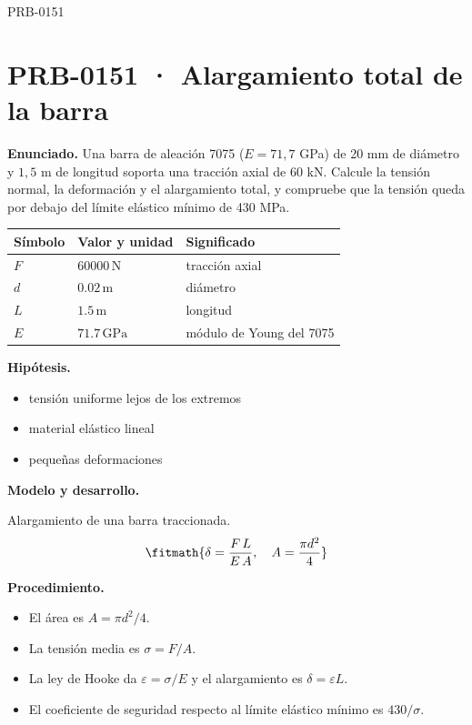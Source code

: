 \begin{studiumworked}{PRB-0151}

\section{PRB-0151 · Alargamiento total de la barra}

\textbf{Enunciado.} Una barra de aleación 7075 ($E = 71{,}7$ GPa) de 20 mm de diámetro y $1{,}5$ m de longitud soporta una tracción axial de 60 kN. Calcule la tensión normal, la deformación y el alargamiento total, y compruebe que la tensión queda por debajo del límite elástico mínimo de 430 MPa.

\par\medskip\noindent\begin{tabular}{@{}p{.18\linewidth}p{.26\linewidth}p{.48\linewidth}@{}}
\toprule Símbolo & Valor y unidad & Significado\\\midrule
$F$ & $60000\,\mathrm{N}$ & tracción axial\\
$d$ & $0.02\,\mathrm{m}$ & diámetro\\
$L$ & $1.5\,\mathrm{m}$ & longitud\\
$E$ & $71.7\,\mathrm{GPa}$ & módulo de Young del 7075\\
\bottomrule\end{tabular}\par\medskip

\textbf{Hipótesis.}\begin{itemize}\item tensión uniforme lejos de los extremos
\item material elástico lineal
\item pequeñas deformaciones\end{itemize}

\textbf{Modelo y desarrollo.}

Alargamiento de una barra traccionada.\[\fitmath{\delta = \frac{F\,L}{E\,A},\quad A = \frac{\pi d^{2}}{4}}\]

\textbf{Procedimiento.}\begin{itemize}\item El área es $A = \pi d^2/4$.
\item La tensión media es $\sigma = F/A$.
\item La ley de Hooke da $\varepsilon = \sigma/E$ y el alargamiento es $\delta = \varepsilon L$.
\item El coeficiente de seguridad respecto al límite elástico mínimo es $430/\sigma$.\end{itemize}


\end{studiumworked}
